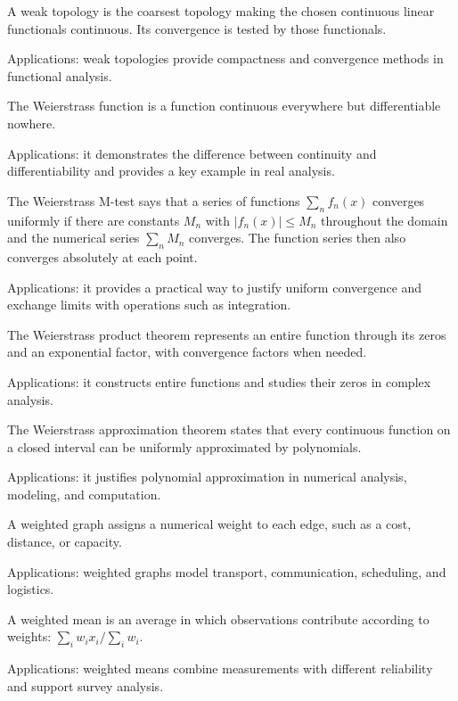 A weak topology is the coarsest topology making the chosen continuous linear functionals continuous. Its convergence is tested by those functionals. \par\noindent Applications: weak topologies provide compactness and convergence methods in functional analysis.

The Weierstrass function is a function continuous everywhere but differentiable nowhere. \par\noindent Applications: it demonstrates the difference between continuity and differentiability and provides a key example in real analysis.

The Weierstrass M-test says that a series of functions \(\sum_n f_n(x)\) converges uniformly if there are constants \(M_n\) with \(|f_n(x)|\le M_n\) throughout the domain and the numerical series \(\sum_n M_n\) converges. The function series then also converges absolutely at each point. \par\noindent Applications: it provides a practical way to justify uniform convergence and exchange limits with operations such as integration.

The Weierstrass product theorem represents an entire function through its zeros and an exponential factor, with convergence factors when needed. \par\noindent Applications: it constructs entire functions and studies their zeros in complex analysis.

The Weierstrass approximation theorem states that every continuous function on a closed interval can be uniformly approximated by polynomials. \par\noindent Applications: it justifies polynomial approximation in numerical analysis, modeling, and computation.

A weighted graph assigns a numerical weight to each edge, such as a cost, distance, or capacity. \par\noindent Applications: weighted graphs model transport, communication, scheduling, and logistics.

A weighted mean is an average in which observations contribute according to weights: $\sum_iw_ix_i/\sum_iw_i$. \par\noindent Applications: weighted means combine measurements with different reliability and support survey analysis.

